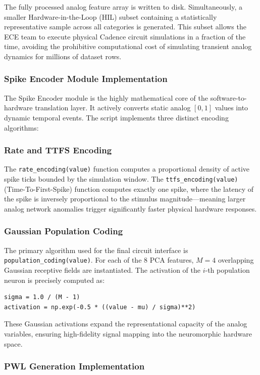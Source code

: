 \documentclass{ieeeaccess}
\begin{document}
The fully processed analog feature array is written to disk. Simultaneously, a smaller Hardware-in-the-Loop (HIL) subset containing a statistically representative sample across all categories is generated. This subset allows the ECE team to execute physical Cadence circuit simulations in a fraction of the time, avoiding the prohibitive computational cost of simulating transient analog dynamics for millions of dataset rows.

\subsubsection{Spike Encoder Module Implementation}

The Spike Encoder module is the highly mathematical core of the software-to-hardware translation layer. It actively converts static analog $[0, 1]$ values into dynamic temporal events. The script implements three distinct encoding algorithms:

\subsubsection{Rate and TTFS Encoding}
The \texttt{rate\_encoding(value)} function computes a proportional density of active spike ticks bounded by the simulation window. The \texttt{ttfs\_encoding(value)} (Time-To-First-Spike) function computes exactly one spike, where the latency of the spike is inversely proportional to the stimulus magnitude—meaning larger analog network anomalies trigger significantly faster physical hardware responses.

\subsubsection{Gaussian Population Coding}
The primary algorithm used for the final circuit interface is \texttt{population\_coding(value)}. For each of the 8 PCA features, $M=4$ overlapping Gaussian receptive fields are instantiated. The activation of the $i$-th population neuron is precisely computed as:
{\scriptsize
\begin{verbatim}
sigma = 1.0 / (M - 1)
activation = np.exp(-0.5 * ((value - mu) / sigma)**2)
\end{verbatim}
}
These Gaussian activations expand the representational capacity of the analog variables, ensuring high-fidelity signal mapping into the neuromorphic hardware space. 

\subsubsection{PWL Generation Implementation}
\end{document}
